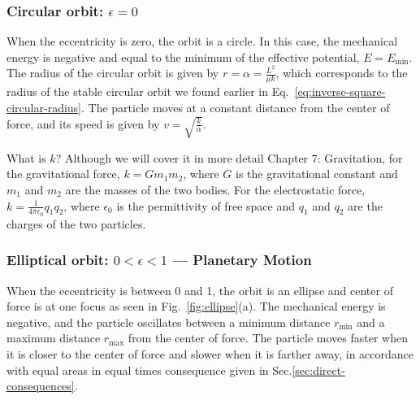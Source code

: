 \documentclass[12pt]{article}
\begin{document}
\subsubsection*{Circular orbit: $\epsilon = 0$}
When the eccentricity is zero, the orbit is a circle. In this case, the mechanical energy is negative and equal to the minimum of the effective potential, $E = E_{\min}$. The radius of the circular orbit is given by $r = \alpha = \frac{L^2}{\mu k}$, which corresponds to the radius of the stable circular orbit we found earlier in Eq.~\ref{eq:inverse-square-circular-radius}. The particle moves at a constant distance from the center of force, and its speed is given by $v = \sqrt{\frac{k}{\alpha}}$.

What is $k$? Although we will cover it in more detail Chapter 7: Gravitation, for the gravitational force, $k = Gm_1m_2$, where $G$ is the gravitational constant and $m_1$ and $m_2$ are the masses of the two bodies. For the electrostatic force, $k = \frac{1}{4\pi\epsilon_0}q_1q_2$, where $\epsilon_0$ is the permittivity of free space and $q_1$ and $q_2$ are the charges of the two particles.

\subsubsection*{Elliptical orbit: $0 < \epsilon < 1$ --- Planetary Motion}
When the eccentricity is between 0 and 1, the orbit is an ellipse and center of force is at one focus as seen in Fig.~\ref{fig:ellipse}(a). The mechanical energy is negative, and the particle oscillates between a minimum distance $r_{\min}$ and a maximum distance $r_{\max}$ from the center of force.  The particle moves faster when it is closer to the center of force and slower when it is farther away, in accordance with equal areas in equal times consequence given in Sec.\ref{sec:direct-consequences}.
\end{document}
